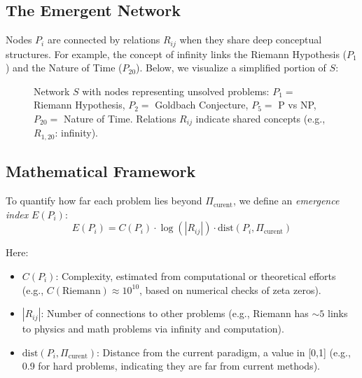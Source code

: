 \documentclass[12pt]{article}
\begin{document}
\subsection*{The Emergent Network}
{\sloppy
Nodes \(P_i\) are connected by relations \(R_{ij}\) when they share deep conceptual structures. For example, the concept of infinity links the Riemann Hypothesis (\(P_1\)) and the Nature of Time (\(P_{20}\)).
}
Below, we visualize a simplified portion of \(S\):
\begin{figure}[ht]
  \centering
  \caption{Network \(S\) with nodes representing unsolved problems: \(P_1 =\) Riemann Hypothesis, \(P_2 =\) Goldbach Conjecture, \(P_5 =\) P vs NP, \(P_{20} =\) Nature of Time. Relations \(R_{ij}\) indicate shared concepts (e.g., \(R_{1,20}\): infinity).}
  \label{fig:network}
\end{figure}

\subsection*{Mathematical Framework}
To quantify how far each problem lies beyond \(\Pi_{\text{curent}}\), we define an \emph{emergence index} \(E(P_i)\):
\begin{equation}
  \label{eq:emergence_index}
  E(P_i) = C(P_i) \cdot \log(|R_{ij}|) \cdot \text{dist}(P_i, \Pi_{\text{curent}})
\end{equation}

\vspace{0.2cm}
Here:
\begin{itemize}
  \item \(C(P_i)\): Complexity, estimated from computational or theoretical efforts (e.g., \(C(\text{Riemann}) \approx 10^{10}\), based on numerical checks of zeta zeros).
  \item \(|R_{ij}|\): Number of connections to other problems (e.g., Riemann has \(\sim 5\) links to physics and math problems via infinity and computation).
  \item \(\text{dist}(P_i, \Pi_{\text{curent}})\): Distance from the current paradigm, a value in [0,1] (e.g., 0.9 for hard problems, indicating they are far from current methods).
\end{itemize}
\end{document}
